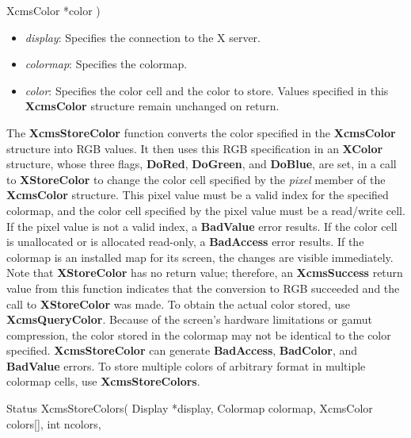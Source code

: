 \documentclass{report}
\begin{document}
\begin{itemize}
\begin{cppcode}
                    XcmsColor *color
                )
            \end{cppcode}
            \begin{itemize}
                \item \textit{display}: Specifies the connection to the X server.
                \item \textit{colormap}: Specifies the colormap.
                \item \textit{color}: Specifies the color cell and the color to store. Values specified in this \textbf{XcmsColor} structure remain unchanged on return.
            \end{itemize}
            \noindent
            The \textbf{XcmsStoreColor} function converts the color specified in the \textbf{XcmsColor} structure into RGB values. It then uses this RGB specification in an \textbf{XColor} structure, whose three flags, \textbf{DoRed}, \textbf{DoGreen}, and \textbf{DoBlue}, are set, in a call to \textbf{XStoreColor} to change the color cell specified by the \textit{pixel} member of the \textbf{XcmsColor} structure.
            \bigbreak \noindent
            This pixel value must be a valid index for the specified colormap, and the color cell specified by the pixel value must be a read/write cell. If the pixel value is not a valid index, a \textbf{BadValue} error results. If the color cell is unallocated or is allocated read-only, a \textbf{BadAccess} error results. If the colormap is an installed map for its screen, the changes are visible immediately.
            \bigbreak \noindent
            Note that \textbf{XStoreColor} has no return value; therefore, an \textbf{XcmsSuccess} return value from this function indicates that the conversion to RGB succeeded and the call to \textbf{XStoreColor} was made. To obtain the actual color stored, use \textbf{XcmsQueryColor}. Because of the screen's hardware limitations or gamut compression, the color stored in the colormap may not be identical to the color specified.
            \bigbreak \noindent
            \textbf{XcmsStoreColor} can generate \textbf{BadAccess}, \textbf{BadColor}, and \textbf{BadValue} errors.
            \bigbreak \noindent
            To store multiple colors of arbitrary format in multiple colormap cells, use \textbf{XcmsStoreColors}.
            \bigbreak \noindent
            \begin{cppcode}
                Status XcmsStoreColors(
                    Display *display,
                    Colormap colormap,
                    XcmsColor colors[],
                    int ncolors,

\end{cppcode}
\end{itemize}
\end{document}
